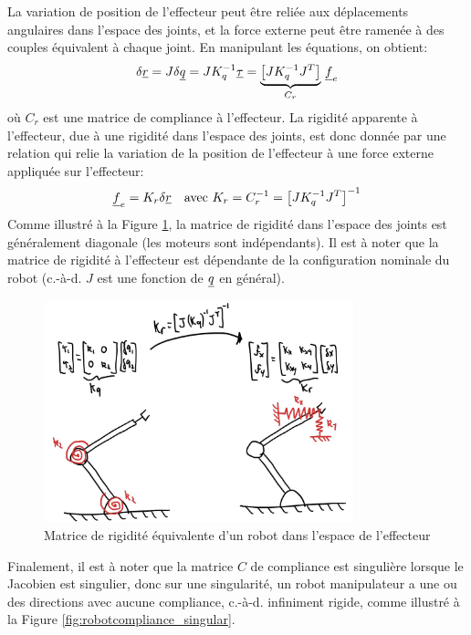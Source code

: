 La variation de position de l'effecteur peut être reliée aux déplacements angulaires dans l'espace des joints, et la force externe peut être ramenée à des couples équivalent à chaque joint. En manipulant les équations, on obtient:
\begin{align}
	\delta \underline{r} = J \delta \underline{q} = J K_q^{-1} \underline{\tau} =
	\underbrace{
		\left[ J K_q^{-1} J^T \right]
	}_{C_r} \,  \underline{f}_e
\end{align}
où $C_r$ est une matrice de compliance à l'effecteur. La rigidité apparente à l'effecteur, due à une rigidité dans l'espace des joints, est donc donnée par une relation qui relie la variation de la position de l'effecteur à une force externe appliquée sur l'effecteur:
\begin{align}
	\underline{f}_e = K_r \delta \underline{r} \quad \text{avec } K_r = C_r^{-1} = \left[ J K_q^{-1} J^T \right]^{-1}
\end{align}
Comme illustré à la Figure \ref{fig:robotcompliance_effector}, la matrice de rigidité dans l'espace des joints est généralement diagonale (les moteurs sont indépendants). Il est à noter que la matrice de rigidité à l'effecteur est dépendante de la configuration nominale du robot (c.-à-d. $J$ est une fonction de $\underline{q}$ en général).
\begin{figure}[htbp]
	\centering
	\includegraphics[width=0.80\textwidth]{fig/robotcompliance_effector.jpg}
	\caption{Matrice de rigidité équivalente d'un robot dans l'espace de l'effecteur}
	\label{fig:robotcompliance_effector}
\end{figure}
%
Finalement, il est à noter que la matrice $C$ de compliance est singulière lorsque le Jacobien est singulier, donc sur une singularité, un robot manipulateur a une ou des directions avec aucune compliance, c.-à-d. infiniment rigide, comme illustré à la Figure \ref{fig:robotcompliance_singular}.
